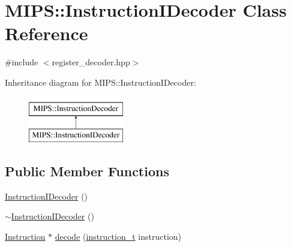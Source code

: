 \hypertarget{classMIPS_1_1InstructionIDecoder}{}\section{M\+I\+PS\+:\+:Instruction\+I\+Decoder Class Reference}
\label{classMIPS_1_1InstructionIDecoder}


{\ttfamily \#include $<$register\+\_\+decoder.\+hpp$>$}

Inheritance diagram for M\+I\+PS\+:\+:Instruction\+I\+Decoder\+:\begin{figure}[H]
\begin{center}
\leavevmode
\includegraphics[height=2.000000cm]{classMIPS_1_1InstructionIDecoder}
\end{center}
\end{figure}
\subsection*{Public Member Functions}
\begin{DoxyCompactItemize}
\item 
\hyperlink{classMIPS_1_1InstructionIDecoder_a2bda3506b713f9ff4d9dddeab27b4820}{Instruction\+I\+Decoder} ()
\item 
\hyperlink{classMIPS_1_1InstructionIDecoder_ab26dc4f11b95e537239a8b83112d9899}{$\sim$\+Instruction\+I\+Decoder} ()
\item 
\hyperlink{classMIPS_1_1Instruction}{Instruction} $\ast$ \hyperlink{classMIPS_1_1InstructionIDecoder_a5f82ec698a702aee381fe80bb9508c2b}{decode} (\hyperlink{core_8hpp_aa514fd240a0e29abb2a2e4c805d7f1a4}{instruction\+\_\+t} instruction)
\end{DoxyCompactItemize}
